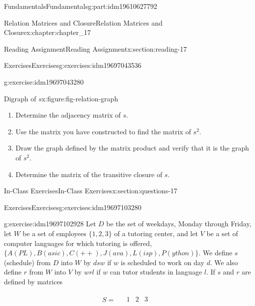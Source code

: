 \documentclass[oneside,10pt,]{book}
\numberwithin{equation}{section}
\begin{document}
\begin{partptx}{Fundamentals}{}{Fundamentals}{}{}{g:part:idm19610627792}
\begin{chapterptx}{Relation Matrices and Closure}{}{Relation Matrices and Closure}{}{}{x:chapter:chapter_17}
\begin{sectionptx}{Reading Assignment}{}{Reading Assignment}{}{}{x:section:reading-17}
\begin{exercises-subsection-numberless}{Exercises}{}{Exercises}{}{}{g:exercises:idm19697043536}
\begin{exercisegroup}
\begin{divisionexerciseeg}{1}{}{}{g:exercise:idm19697043280}
\begin{figureptx}{Digraph of \(s\)}{x:figure:fig-relation-graph}{}
\begin{image}{0.25}{0.5}{0.25}
\end{image}%
\tcblower
\end{figureptx}%
%
\begin{enumerate}[label=(\alph*)]
\item{}Determine the adjacency matrix of \(s\).%
\item{}Use the matrix you have constructed to find the matrix of \(s^2\).%
\item{}Draw the graph defined by the matrix product and verify that it is the graph of \(s^2\).%
\item{}Determine the matrix of the transitive closure of \(s\).%
\end{enumerate}
%
\end{divisionexerciseeg}%
\end{exercisegroup}
\par\medskip\noindent
\end{exercises-subsection-numberless}
\end{sectionptx}
%
%
\typeout{************************************************}
\typeout{************************************************}
%
\begin{sectionptx}{In-Class Exercises}{}{In-Class Exercises}{}{}{x:section:questions-17}
%
%
%
\typeout{************************************************}
\typeout{************************************************}
%
\begin{exercises-subsection-numberless}{Exercises}{}{Exercises}{}{}{g:exercises:idm19697103280}
\par\medskip\noindent%
%
\begin{exercisegroup}
\begin{divisionexerciseeg}{1}{}{}{g:exercise:idm19697102928}%
Let \(D\) be the set of weekdays, Monday through Friday, let \(W\) be a set of employees \(\{1, 2, 3\}\) of a tutoring center, and let \(V\) be a set of computer languages for which tutoring is offered,  \(\{A(PL), B(asic), C(++), J(ava), L(isp), P(ython)\}\). We define \(s\) (schedule) from \(D\) into \(W\) by \(d s w\) if \(w\) is scheduled to work on day \(d\). We also define \(r\) from \(W\) into \(V\) by \(w r l\) if \(w\) can tutor students in language \(l\). If \(s\) and \(r\) are defined by matrices%
\par
%
\begin{equation*}
S = 
\begin{array}{cc}
& 
\begin{array}{ccc}
1 & 2 & 3 \\

\end{array}
\end{array}
\end{equation*}
\end{divisionexerciseeg}
\end{exercisegroup}
\end{exercises-subsection-numberless}
\end{sectionptx}
\end{chapterptx}
\end{partptx}
\end{document}
